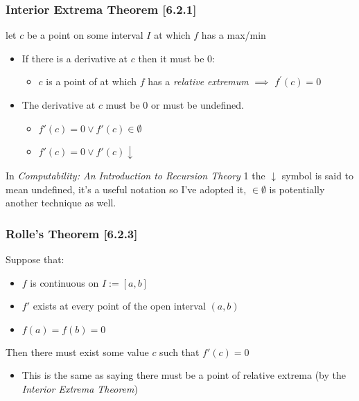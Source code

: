 \documentclass[
]{article}
\begin{document}
\hypertarget{header-n3999}{%
\subsubsection{Interior Extrema Theorem
{[}6.2.1{]}}\label{header-n3999}}

let \(c\) be a point on some interval \(I\) at which \(f\) has a max/min

\begin{itemize}
\item
  If there is a derivative at \(c\) then it must be 0:

  \begin{itemize}
  \item
    \(c\) is a point of at which \(f\) has a \emph{relative extremum}
    \(\implies\) \(f^{\prime}(c)=0\)
  \end{itemize}
\item
  The derivative at \(c\) must be 0 or must be undefined.

  \begin{itemize}
  \item
    \(f'(c) = 0 \vee f'(c) \in \emptyset\)
  \item
    \(f'(c) = 0 \vee f'(c) \downarrow\)
  \end{itemize}
\end{itemize}

In \emph{Computability: An Introduction to Recursion Theory} 1 the
\(\downarrow\) symbol is said to mean undefined, it's a useful notation
so I've adopted it, \(\in \emptyset\) is potentially another technique
as well.

\newpage
\hypertarget{header-n4017}{%
\subsubsection{Rolle's Theorem {[}6.2.3{]}}\label{header-n4017}}

Suppose that:

\begin{itemize}
\item
  \(f\) is continuous on \(I:= [a,b]\)
\item
  \(f'\) exists at every point of the open interval \((a,b)\)
\item
  \(f(a) = f(b) = 0\)
\end{itemize}

Then there must exist some value \(c\) such that \(f'(c) = 0\)

\begin{itemize}
\item
  This is the same as saying there must be a point of relative extrema
  (by the \emph{Interior Extrema Theorem})
\end{itemize}
\end{document}
